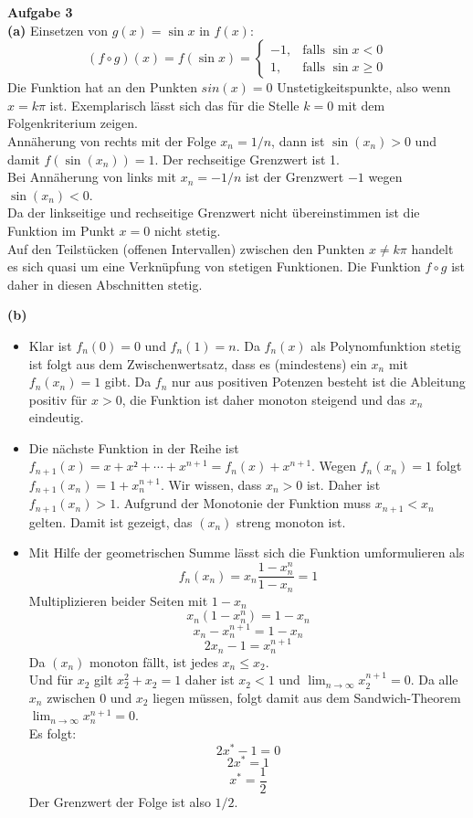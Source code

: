 \documentclass[a4paper,12pt]{article}
\begin{document}
\raggedright
\doublespacing


\noindent\textbf{Aufgabe 3} \\
\noindent\textbf{(a)} 
Einsetzen von $g(x) = \sin x$ in $f(x)$:$$(f \circ g)(x) = f(\sin x) = \begin{cases} -1, & \text{falls } \sin x < 0 \\ 1, & \text{falls } \sin x \ge 0 \end{cases}$$
Die Funktion hat an den Punkten $sin(x)=0$ Unstetigkeitspunkte, also wenn $x=k\pi$ ist. Exemplarisch lässt sich das für die Stelle $k=0$ mit dem Folgenkriterium zeigen. \\
Annäherung von rechts mit der Folge $x_n = 1/n$, dann ist $\sin(x_n)>0$ und damit $f(\sin(x_n)) = 1$. Der rechseitige Grenzwert ist 1. \\
Bei Annäherung von links mit $x_n = - 1/n$ ist der Grenzwert $-1$ wegen $\sin(x_n)<0$. \\
Da der linkseitige und rechseitige Grenzwert nicht übereinstimmen ist die Funktion im Punkt $x=0$ nicht stetig. \\
Auf den Teilstücken (offenen Intervallen) zwischen den Punkten  $x \neq k\pi$ handelt es sich quasi um eine Verknüpfung von stetigen Funktionen. Die Funktion $f \circ g$ ist daher in diesen Abschnitten stetig.

\bigskip
\noindent\textbf{(b)} \\
\begin{itemize}
    \item Klar ist $f_n(0) =0$ und $f_n(1) = n$.
Da $f_n(x)$ als Polynomfunktion stetig ist folgt aus dem Zwischenwertsatz, dass es (mindestens) ein $x_n$ mit $f_n(x_n)=1$ gibt. Da $f_n$ nur aus positiven Potenzen besteht ist die Ableitung positiv für $x>0$, die Funktion ist daher monoton steigend und das $x_n$ eindeutig. 
\item Die nächste Funktion in der Reihe ist $f_{n+1}(x)=x+x²+ \cdots + x^{n+1}=f_n(x)+x^{n+1} $. Wegen $f_n(x_n)=1$ folgt $f_{n+1}(x_n) = 1 + x_n^{n+1}$. Wir wissen, dass $x_n > 0$ ist. Daher ist $f_{n+1}(x_n) > 1$. Aufgrund der Monotonie der Funktion muss $x_{n+1} < x_n$ gelten. Damit ist gezeigt, das $(x_n)$ streng monoton ist.
\item Mit Hilfe der geometrischen Summe lässt sich die Funktion umformulieren als 
$$f_n(x_n) = x_n \frac{1-x_n^n}{1-x_n}= 1$$
Multiplizieren beider Seiten mit $1-x_n$
$$x_n(1-x_n^n)=1-x_n$$
$$x_n - x_n^{n+1} = 1 - x_n$$
$$2x_n - 1 = x_n^{n+1}$$
Da $(x_n)$ monoton fällt, ist jedes $x_n \le x_2$.
 \\
 Und für $x_2$ gilt $x_2^2 + x_2 = 1$ daher ist $x_2 <1$ und $\lim_{n\to\infty} x_2^{n+1} = 0$. Da alle $x_n$ zwischen $0$ und $x_2$ liegen müssen, folgt damit aus dem Sandwich-Theorem $\lim_{n \to \infty} x_n^{n+1} = 0$. \\
Es folgt:
$$2x^* - 1 = 0$$$$2x^* = 1$$$$x^* = \frac{1}{2}$$Der Grenzwert der Folge ist also $1/2$.

\end{itemize}
\end{document}
